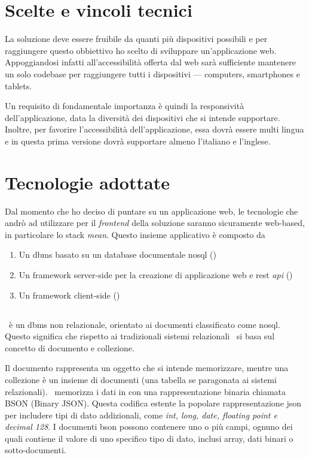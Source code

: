 \section{Scelte e vincoli tecnici} 

La soluzione deve essere fruibile da quanti più dispositivi possibili e per raggiungere questo obbiettivo ho scelto di sviluppare un'applicazione web. Appoggiandosi infatti all'accessibilità offerta dal web sarà sufficiente mantenere un solo codebase per raggiungere tutti i dispositivi --- computers, smartphones e tablets.

Un requisito di fondamentale importanza è quindi la responsività dell'applicazione, data la diversità dei dispositivi che si intende supportare. 
Inoltre, per favorire l'accessibilità dell'applicazione, essa dovrà essere multi lingua e in questa prima versione dovrà supportare almeno l'italiano e l'inglese.

\section{Tecnologie adottate}
Dal momento che ho deciso di puntare su un applicazione web, le tecnologie che andrò ad utilizzare per il \textit{\gls{frontend}} della soluzione saranno sicuramente web-based, in particolare lo stack \textit{\gls{mean}}. Questo insieme applicativo è composto da
\begin{enumerate}
	\item Un \acrshort{dbms} basato su un database documentale \acrshort{nosql} (\mongodb)
	\item Un framework server-side per la creazione di applicazione web e rest \textit{\acrshort{api}} (\expressjs)
	\item Un framework client-side (\angular)
\end{enumerate}


\subsection{\mongodb}

\mongodb~è un \gls{dbms} non relazionale, orientato ai documenti classificato come \gls{nosql}. Questo significa che rispetto ai tradizionali sistemi relazionali \mongodb~si basa sul concetto di documento e collezione.

Il documento rappresenta un oggetto che si intende memorizzare, mentre una collezione è un insieme di documenti (una tabella se paragonata ai sistemi relazionali).
\mongodb~memorizza i dati in con una rappresentazione binaria chiamata BSON (Binary JSON). Questa codifica estente la popolare rappresentazione \gls{json} per includere tipi di dato addizionali, come \textit{int, long, date, floating point e decimal 128}. I documenti \acrshort{bson} possono contenere uno o più campi, ognuno dei quali contiene il valore di uno specifico tipo di dato, inclusi array, dati binari o sotto-documenti. \\

